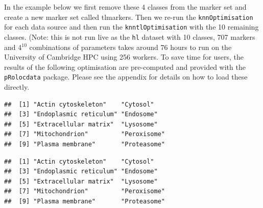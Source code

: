 In the example below we first remove these 4 classes from the marker set
and create a new marker set called tlmarkers. Then we
re-run the \texttt{knnOptimisation} for each data source and then run
the \texttt{knntlOptimisation} with the 10 remaining classes. (Note:
this is not run live as the \texttt{hl} dataset with 10 classes,
707 markers and 4$^{10}$ combinations of parameters takes around 76
hours to run on the University of Cambridge HPC using 256 workers. 
To save time for users, the results of the following optimisation 
are pre-computed and provided with the \texttt{pRolocdata} package. 
Please see the appendix for details on how
to load these directly.



\begin{knitrout}
\color{fgcolor}\begin{kframe}
\begin{alltt}
\hlopt{$} \hlkwb{<-} \hlopt{$}
\hlopt{$} \hlkwb{<-} \hlopt{$}

  \hlkwb{<-} \hlstd{(}\hlstd{,} \hlstd{,}
           \hlstd{,}
           \hlstd{)}
   
   \hlkwb{<-}     \hlstd{=} \hlstd{)}
   \hlkwb{<-}     \hlstd{=} \hlstd{)}
\hlstd{\}}
  \hlstd{=} \hlstd{)}
\end{alltt}
\begin{verbatim}
##  [1] "Actin cytoskeleton"    "Cytosol"              
##  [3] "Endoplasmic reticulum" "Endosome"             
##  [5] "Extracellular matrix"  "Lysosome"             
##  [7] "Mitochondrion"         "Peroxisome"           
##  [9] "Plasma membrane"       "Proteasome"
\end{verbatim}
\begin{alltt}
  \hlstd{=} \hlstd{)}
\end{alltt}
\begin{verbatim}
##  [1] "Actin cytoskeleton"    "Cytosol"              
##  [3] "Endoplasmic reticulum" "Endosome"             
##  [5] "Extracellular matrix"  "Lysosome"             
##  [7] "Mitochondrion"         "Peroxisome"           
##  [9] "Plasma membrane"       "Proteasome"
\end{verbatim}
\end{kframe}
\end{knitrout}

